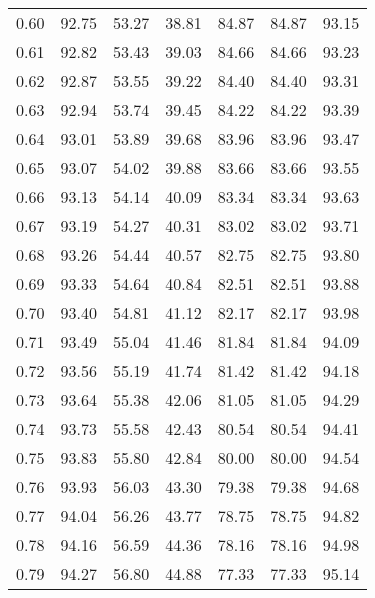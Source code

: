 \begin{tabular}{|c|c|c|c|c|c|c|}
      0.60 &     92.75 &     53.27 &      38.81 &   84.87 &      84.87 &         93.15 \\
      0.61 &     92.82 &     53.43 &      39.03 &   84.66 &      84.66 &         93.23 \\
      0.62 &     92.87 &     53.55 &      39.22 &   84.40 &      84.40 &         93.31 \\
      0.63 &     92.94 &     53.74 &      39.45 &   84.22 &      84.22 &         93.39 \\
      0.64 &     93.01 &     53.89 &      39.68 &   83.96 &      83.96 &         93.47 \\
      0.65 &     93.07 &     54.02 &      39.88 &   83.66 &      83.66 &         93.55 \\
      0.66 &     93.13 &     54.14 &      40.09 &   83.34 &      83.34 &         93.63 \\
      0.67 &     93.19 &     54.27 &      40.31 &   83.02 &      83.02 &         93.71 \\
      0.68 &     93.26 &     54.44 &      40.57 &   82.75 &      82.75 &         93.80 \\
      0.69 &     93.33 &     54.64 &      40.84 &   82.51 &      82.51 &         93.88 \\
      0.70 &     93.40 &     54.81 &      41.12 &   82.17 &      82.17 &         93.98 \\
      0.71 &     93.49 &     55.04 &      41.46 &   81.84 &      81.84 &         94.09 \\
      0.72 &     93.56 &     55.19 &      41.74 &   81.42 &      81.42 &         94.18 \\
      0.73 &     93.64 &     55.38 &      42.06 &   81.05 &      81.05 &         94.29 \\
      0.74 &     93.73 &     55.58 &      42.43 &   80.54 &      80.54 &         94.41 \\
      0.75 &     93.83 &     55.80 &      42.84 &   80.00 &      80.00 &         94.54 \\
      0.76 &     93.93 &     56.03 &      43.30 &   79.38 &      79.38 &         94.68 \\
      0.77 &     94.04 &     56.26 &      43.77 &   78.75 &      78.75 &         94.82 \\
      0.78 &     94.16 &     56.59 &      44.36 &   78.16 &      78.16 &         94.98 \\
      0.79 &     94.27 &     56.80 &      44.88 &   77.33 &      77.33 &         95.14 \\

\end{tabular}
